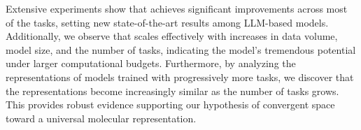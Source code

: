 Extensive experiments show that \method achieves significant improvements across most of the tasks, setting new state-of-the-art results among LLM-based models. Additionally, we observe that \method scales effectively with increases in data volume, model size, and the number of tasks, indicating the model's tremendous potential under larger computational budgets. Furthermore, by analyzing the representations of models trained with progressively more tasks, we discover that the representations become increasingly similar as the number of tasks grows. This provides robust evidence supporting our hypothesis of convergent space toward a universal molecular representation.

